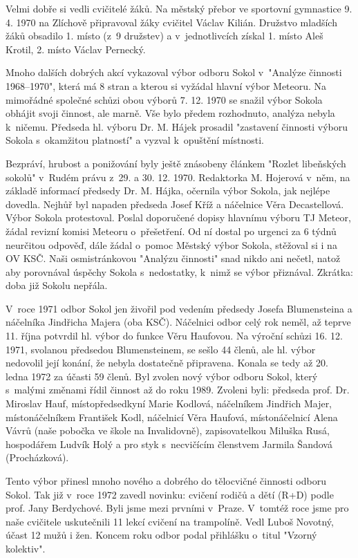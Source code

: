 \documentclass[a5paper, 11pt, twoside]{article}
\begin{document}
Velmi dobře si vedli cvičitelé žáků. Na městský přebor ve sportovní
gymnastice 9. 4. 1970 na Zlíchově připravoval žáky cvičitel Václav
Kilián. Družstvo mladších žáků obsadilo 1. místo (z~9 družstev) a
v~jednotlivcích získal 1. místo Aleš Krotil, 2. místo Václav Pernecký.

Mnoho dalších dobrých akcí vykazoval výbor odboru Sokol v~"Analýze
činnosti 1968--1970", která má 8 stran a kterou si vyžádal hlavní výbor
Meteoru. Na mimořádné společné schůzi obou výborů 7. 12. 1970 se snažil
výbor Sokola obhájit svoji činnost, ale marně. Vše bylo předem
rozhodnuto, analýza nebyla k~ničemu. Předseda hl. výboru Dr. M. Hájek
prosadil "zastavení činnosti výboru Sokola s~okamžitou platností" a
vyzval k~opuštění místnosti.

Bezpráví, hrubost a ponižování byly ještě znásobeny článkem "Rozlet
libeňských sokolů" v~Rudém právu z~29. a 30. 12. 1970. Redaktorka M.
Hojerová v~něm, na základě informací předsedy Dr. M. Hájka, očernila
výbor Sokola, jak nejlépe dovedla. Nejhůř byl napaden předseda Josef
Kříž a náčelnice Věra Decastellová. Výbor Sokola protestoval. Poslal
doporučené dopisy hlavnímu výboru TJ Meteor, žádal revizní komisi
Meteoru o~přešetření. Od ní dostal po urgenci za 6 týdnů neurčitou
odpověď, dále žádal o~pomoc Městský výbor Sokola, stěžoval si i na OV
KSČ. Naši osmistránkovou "Analýzu činnosti" snad nikdo ani nečetl,
natož aby porovnával úspěchy Sokola s~nedostatky, k~nimž se výbor
přiznával. Zkrátka: doba již Sokolu nepřála.

V~roce 1971 odbor Sokol jen živořil pod vedením předsedy Josefa
Blumensteina a náčelníka Jindřicha Majera (oba KSČ). Náčelnici odbor
celý rok neměl, až teprve 11. října potvrdil hl. výbor do funkce Věru
Haufovou. Na výroční schůzi 16. 12. 1971, svolanou předsedou
Blumensteinem, se sešlo 44 členů, ale hl. výbor nedovolil její konání,
že nebyla dostatečně připravena. Konala se tedy až 20. ledna 1972 za
účasti 59 členů. Byl zvolen nový výbor odboru Sokol, který s~malými
změnami řídil činnost až do roku 1989. Zvoleni byli: předseda prof. Dr.
Miroslav Hauf, místopředsedkyní Marie Kodlová, náčelníkem Jindřich
Majer, místonáčelníkem František Kodl, náčelnicí Věra Haufová,
místonáčelnicí Alena Vávrů (naše pobočka ve škole na Invalidovně),
zapisovatelkou Miluška Rusá, hospodářem Ludvík Holý a pro styk
s~necvičícím členstvem Jarmila Šandová (Procházková).

Tento výbor přinesl mnoho nového a dobrého do tělocvičné činnosti odboru
Sokol. Tak již v~roce 1972 zavedl novinku: cvičení rodičů a dětí (R+D)
podle prof. Jany Berdychové. Byli jsme mezi prvními v~Praze. V~tomtéž
roce jsme pro naše cvičitele uskutečnili 11 lekcí cvičení na trampolíně.
Vedl Luboš Novotný, účast 12 mužů i žen. Koncem roku odbor podal
přihlášku o~titul "Vzorný kolektiv".
\end{document}
